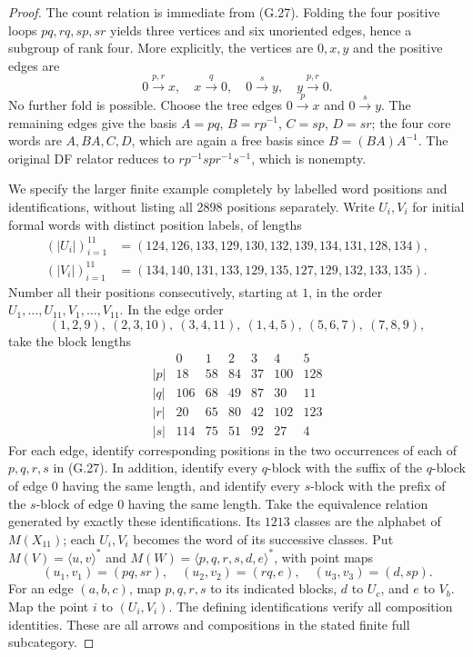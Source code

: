 \begin{proof}
The count relation is immediate from (G.27). Folding the four
positive loops $pq,rq,sp,sr$ yields three vertices and six
unoriented edges, hence a subgroup of rank four. More explicitly,
the vertices are $0,x,y$ and the positive edges are
\[
 0\xrightarrow{p,r}x,\quad x\xrightarrow q0,
 \quad0\xrightarrow s y,\quad y\xrightarrow{p,r}0.
\]
No further fold is possible. Choose the tree edges $0\xrightarrow p x$ and $0\xrightarrow s y$.
The remaining edges give the basis
$A=pq$, $B=rp^{-1}$, $C=sp$, $D=sr$; the four core words
are $A,BA,C,D$, which are again a free basis since
$B=(BA)A^{-1}$. The original DF
relator reduces to
$r p^{-1}s p r^{-1}s^{-1}$, which is nonempty.

We specify the larger finite example completely by labelled
word positions and identifications, without listing all 2898
positions separately. Write $U_i,V_i$ for initial formal words
with distinct position labels, of lengths
\[
\begin{split}
 (|U_i|)_{i=1}^{11}&=(124,126,133,129,130,132,139,134,131,128,134),\\
 (|V_i|)_{i=1}^{11}&=(134,140,131,133,129,135,127,129,132,133,135).
\end{split}
\]
Number all their positions consecutively, starting at $1$, in
the order $U_1,\ldots,U_{11},V_1,\ldots,V_{11}$. In the edge order
\[
 (1,2,9),\ (2,3,10),\ (3,4,11),\ (1,4,5),\ (5,6,7),\ (7,8,9),
\]
take the block lengths
\[
\begin{array}{c|rrrrrr}
 &0&1&2&3&4&5\\\hline
 |p|&18&58&84&37&100&128\\
 |q|&106&68&49&87&30&11\\
 |r|&20&65&80&42&102&123\\
 |s|&114&75&51&92&27&4
\end{array}
\]
For each edge, identify corresponding positions in the two
occurrences of each of $p,q,r,s$ in (G.27). In addition,
identify every $q$-block with the suffix of the $q$-block of
edge $0$ having the same length, and identify every $s$-block
with the prefix of the $s$-block of edge $0$ having the same
length. Take the equivalence relation generated by exactly
these identifications. Its $1213$ classes are the alphabet of
$M(X_{11})$; each $U_i,V_i$ becomes the word of its successive
classes. Put $M(V)=\langle u,v\rangle^*$ and
$M(W)=\langle p,q,r,s,d,e\rangle^*$, with point maps
\[
 (u_1,v_1)=(pq,sr),\quad (u_2,v_2)=(rq,e),
 \quad (u_3,v_3)=(d,sp).
\]
For an edge $(a,b,c)$, map $p,q,r,s$ to its indicated blocks,
$d$ to $U_c$, and $e$ to $V_b$. Map the point $i$ to
$(U_i,V_i)$. The defining identifications verify all composition
identities. These are all arrows and compositions in the stated
finite full subcategory.


\end{proof}
